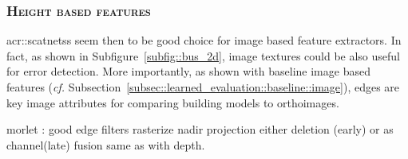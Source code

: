         \subsubsection{\textsc{Height based features}}
            \glspl{acr::scatnets} seem then to be good choice for image based feature extractors.
            In fact, as shown in Subfigure~\ref{subfig::bus_2d}, image textures could be also useful for error detection.
            More importantly, as shown with baseline image based features (\textit{cf.} Subsection~\ref{subsec::learned_evaluation::baseline::image}), edges are key image attributes for comparing building models to orthoimages.
            
            morlet : good edge filters
            rasterize nadir projection
            either deletion (early) or as channel(late) fusion
            same as with depth.
